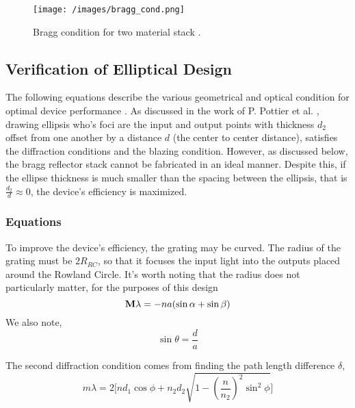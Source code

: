 \documentclass{article}
\begin{document}
\begin{figure}[H]
\centering
\texttt{[image: /images/bragg\_cond.png]}
\caption{ Bragg condition for two material stack \cite{Packirisamy2012Mono-OrderGrating}.}
\label{fig:nanos_test_code0}
\end{figure}

\subsection{Verification of Elliptical Design}
The following equations describe the various geometrical and optical condition for optimal device performance \cite{Packirisamy2012Mono-OrderGrating,Pottier2014IntegratedInsulator}. As discussed in the work of P. Pottier et al. \cite{Packirisamy2012Mono-OrderGrating}, drawing ellipsis who's foci are the input and output points with thickness $d_2$ offset from one another by a distance $d$ (the center to center distance), satisfies the diffraction conditions and the blazing condition. However, as discussed below, the bragg reflector stack cannot be fabricated in an ideal manner. Despite this, if the ellipse thickness is much smaller than the spacing between the ellipsis, that is $\frac{d_2}{d} \approx 0$, the device's efficiency is maximized.

\subsubsection{Equations}

To improve the device's efficiency, the grating may be curved. The radius of the grating must be $2 R_{RC}$, so that it focuses the input light into the outputs placed around the Rowland Circle. It's worth noting that the radius does not particularly matter, for the purposes of this design
\begin{equation}
    \vb{M \lambda} = - n a (\sin{\alpha} + \sin{\beta})
    \label{eq:a}
\end{equation}
                We also note, 
\begin{equation*}
    \sin{\theta} = \frac{d}{a}
\end{equation*}
                
The second diffraction condition comes from finding the path length difference $\delta$,
\begin{equation*}
    m \lambda = 2 \Bigg[ n d_1 \cos{\phi} + n_2 d_2 \sqrt{1-(\frac{n}{n_2})^2 \sin^2 \phi} \Bigg]
\end{equation*}
\end{document}
